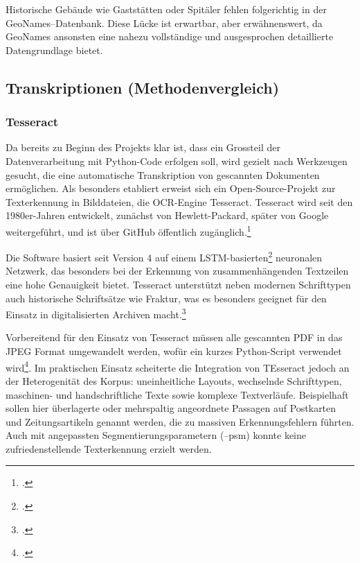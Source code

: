 \documentclass[12pt, a4paper, ngerman, bidi=default]{article}
\let\cite\footcite
\begin{document}
Historische Gebäude wie Gaststätten oder Spitäler fehlen folgerichtig in der GeoNames–Datenbank. Diese Lücke ist erwartbar, aber erwähnenswert, da GeoNames 
ansonsten eine nahezu vollständige und ausgesprochen detaillierte Datengrundlage bietet.

\subsection{Transkriptionen (Methodenvergleich)}\label{section:Transkriptionen_Methoden}
\subsubsection{Tesseract}\label{subsubsection:Tesseract}

Da bereits zu Beginn des Projekts klar ist, dass ein Grossteil der Datenverarbeitung mit Python-Code erfolgen soll, wird gezielt 
nach Werkzeugen gesucht, die eine automatische Transkription von gescannten Dokumenten ermöglichen. 
Als besonders etabliert erweist sich ein Open-Source-Projekt zur Texterkennung in Bilddateien, die OCR-Engine Tesseract. 
Tesseract wird seit den 1980er-Jahren entwickelt, zunächst von Hewlett-Packard, später von Google weitergeführt, 
und ist über GitHub öffentlich zugänglich.\cite[vgl.][]{weil_tesseract-ocrtesseract_2025}

Die Software basiert seit Version 4 auf einem LSTM-basierten\cite[Abk.: \textbf{LSTM} steht für \textit{Long Short-Term Memory};  Architektur der frühen Generation rekurrenter neuronaler Netzwerke \textit{RNNs}. LSTMs wurden entwickelt, um Sequenzdaten zu verarbeiten und dabei sowohl kurzfristige als auch langfristige Abhängigkeiten in der Datenfolge zu erfassen – ein typisches Beispiel sind Texte, Sprache, Zeitreihen oder Handschrift. ;vgl.][p.1-2]{beck_review_2020} neuronalen Netzwerk, das besonders bei der Erkennung von zusammenhängenden Textzeilen eine 
hohe Genauigkeit bietet. Tesseract unterstützt neben modernen Schrifttypen auch historische Schriftsätze wie Fraktur, was es besonders geeignet 
für den Einsatz in digitalisierten Archiven macht.\cite[vgl.][]{weil_tesseract-ocrtesseract_2025}

Vorbereitend für den Einsatz von Tesseract müssen alle gescannten PDF in das JPEG Format umgewandelt werden, wofür ein kurzes Python-Script verwendet wird\cite[vgl.][]{burkhardt_githubpdf_to_jpegpy_2025}. 
Im praktischen Einsatz scheiterte die Integration von TEsseract jedoch an der Heterogenität des Korpus: uneinheitliche Layouts, wechselnde 
Schrifttypen, maschinen- und handschriftliche Texte sowie komplexe Textverläufe. Beispielhaft sollen hier überlagerte oder mehrspaltig angeordnete 
Passagen auf Postkarten und Zeitungsartikeln genannt werden, die zu massiven Erkennungsfehlern führten. Auch mit angepassten Segmentierungsparametern (--psm) 
konnte keine zufriedenstellende Texterkennung erzielt werden.
\end{document}
